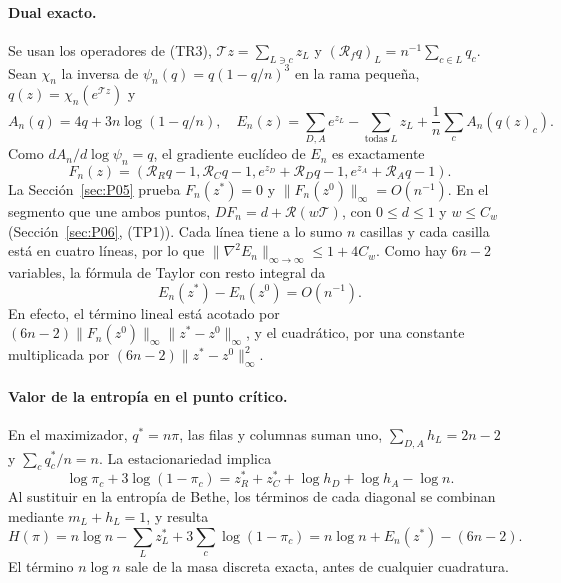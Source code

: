 \paragraph{Dual exacto.}
Se usan los operadores de (TR3), $\mathcal Tz=\sum_{L\ni c}z_L$ y
$(\mathcal R_fq)_L=n^{-1}\sum_{c\in L}q_c$.
Sean $\chi_n$ la inversa de $\psi_n(q)=q(1-q/n)^3$ en la rama pequeña,
$q(z)=\chi_n(e^{\mathcal Tz})$ y
\[
 A_n(q)=4q+3n\log(1-q/n),
 \quad E_n(z)=\sum_{D,A}e^{z_L}-\sum_{\text{todas }L}z_L
                         +\frac1n\sum_c A_n(q(z)_c).       \tag{D1.2}
\]
Como $dA_n/d\log\psi_n=q$, el gradiente euclídeo de $E_n$ es exactamente
\[
 F_n(z)=(\mathcal R_Rq-1,\mathcal R_Cq-1,
                 e^{z_D}+\mathcal R_Dq-1,e^{z_A}+\mathcal R_Aq-1).
\]
La Sección~\ref{sec:P05} prueba $F_n(z^*)=0$ y
$\|F_n(z^0)\|_\infty=O(n^{-1})$. En el segmento que une ambos puntos,
$DF_n=d+\mathcal R(w\mathcal T)$, con $0\le d\le1$ y
$w\le C_w$ (Sección~\ref{sec:P06}, (TP1)). Cada línea tiene a lo sumo $n$ casillas
y cada casilla está en cuatro líneas, por lo que
$\|\nabla^2E_n\|_{\infty\to\infty}\le1+4C_w$.
Como hay $6n-2$ variables, la fórmula de Taylor con resto integral da
\[
 E_n(z^*)-E_n(z^0)=O(n^{-1}).                         \tag{D1.3}
\]
En efecto, el término lineal está acotado por
$(6n-2)\|F_n(z^0)\|_\infty\|z^*-z^0\|_\infty$,
y el cuadrático, por una constante multiplicada por
$(6n-2)\|z^*-z^0\|_\infty^2$.

\paragraph{Valor de la entropía en el punto crítico.}
En el maximizador, $q^*=n\pi$, las filas y columnas suman uno,
$\sum_{D,A}h_L=2n-2$ y $\sum_c q_c^*/n=n$.
La estacionariedad implica
\[
 \log\pi_c+3\log(1-\pi_c)
       =z^*_{R}+z^*_{C}+\log h_D+\log h_A-\log n.
\]
Al sustituir en la entropía de Bethe, los términos de cada diagonal
se combinan mediante $m_L+h_L=1$, y resulta
\[
 H(\pi)=n\log n-\sum_Lz_L^*+3\sum_c\log(1-\pi_c)
       =n\log n+E_n(z^*)-(6n-2).                    \tag{D1.4}
\]
El término $n\log n$ sale de la masa discreta exacta, antes de cualquier cuadratura.

